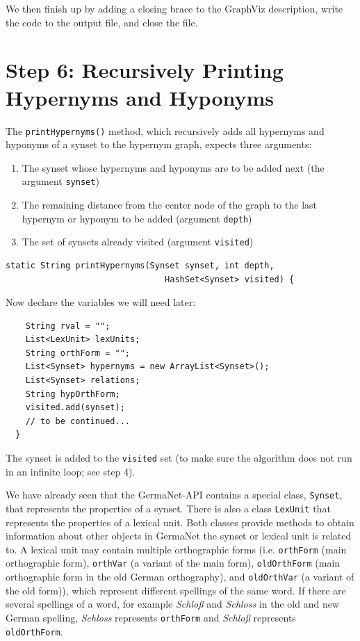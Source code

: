 \documentclass[12pt,a4paper,english,utf8]{report}
\begin{document}
We then finish up by adding a closing brace to the GraphViz description, write the code to the output file, and close the file.



\section{Step 6: Recursively Printing Hypernyms and Hyponyms}
The \texttt{printHypernyms()} method, which recursively adds all hypernyms and hyponyms of a synset to the hypernym graph, expects three arguments:

\begin{enumerate}
	\item The synset whose hypernyms and hyponyms are to be added next (the argument \texttt{synset})
	\item The remaining distance from the center node of the graph to the last hypernym or hyponym to be added (argument \texttt{depth})
	\item The set of synsets already visited (argument \texttt{visited})
\end{enumerate}

\begin{lstlisting}
static String printHypernyms(Synset synset, int depth,
                                HashSet<Synset> visited) {
\end{lstlisting}

Now declare the variables we will need later:

\begin{lstlisting}
    String rval = "";
    List<LexUnit> lexUnits;
    String orthForm = "";
    List<Synset> hypernyms = new ArrayList<Synset>();
    List<Synset> relations;
    String hypOrthForm;
    visited.add(synset);
    // to be continued...
  }
\end{lstlisting}

The synset is added to the \texttt{visited} set (to make sure the algorithm does not run in an infinite loop; see step 4).

We have already seen that the GermaNet-API contains a special class, \texttt{Synset}, that represents the properties of a synset. There is also a class \texttt{LexUnit} that represents the properties of a lexical unit. Both classes provide methods to obtain information about other objects in GermaNet the synset or lexical unit is related to. A lexical unit may contain multiple orthographic forms (i.e. \texttt{orthForm} (main orthographic form), \texttt{orthVar} (a variant of the main form), \texttt{oldOrthForm} (main orthographic form in the old German orthography), and \texttt{oldOrthVar} (a variant of the old form)), which represent different spellings of the same word. If there are several spellings of a word, for example \emph{Schloß} and \emph{Schloss} in the old and new German spelling, \emph{Schloss} represents \texttt{orthForm} and \emph{Schloß} represents \texttt{oldOrthForm}.
\end{document}
